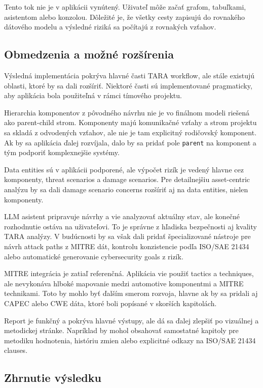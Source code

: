 \documentclass[11pt]{article}
\begin{document}
Tento tok nie je v aplikácii vynútený. Uživateľ môže začať grafom, tabuľkami, asistentom alebo konzolou. Dôležité je, že všetky cesty zapisujú do rovnakého dátového modelu a výsledné riziká sa počítajú z rovnakých vzťahov.

\subsection{Obmedzenia a možné rozšírenia}

Výsledná implementácia pokrýva hlavné časti TARA workflow, ale stále existujú oblasti, ktoré by sa dali rozšíriť. Niektoré časti sú implementované pragmaticky, aby aplikácia bola použiteľná v rámci tímového projektu.

Hierarchia komponentov z pôvodného návrhu nie je vo finálnom modeli riešená ako parent-child strom. Komponenty majú komunikačné vzťahy a strom projektu sa skladá z odvodených vzťahov, ale nie je tam explicitný rodičovský komponent. Ak by sa aplikácia ďalej rozvíjala, dalo by sa pridať pole \texttt{parent} na komponent a tým podporiť komplexnejšie systémy.

Data entities sú v aplikácii podporené, ale výpočet rizík je vedený hlavne cez komponenty, threat scenarios a damage scenarios. Pre detailnejšiu asset-centric analýzu by sa dali damage scenario concerns rozšíriť aj na data entities, nielen komponenty.

LLM asistent pripravuje návrhy a vie analyzovať aktuálny stav, ale konečné rozhodnutie ostáva na uživateľovi. To je správne z hľadiska bezpečnosti aj kvality TARA analýzy. V budúcnosti by sa však dali pridať špecializované nástroje pre návrh attack paths z MITRE dát, kontrolu konzistencie podľa ISO/SAE 21434 alebo automatické generovanie cybersecurity goals z rizík.

MITRE integrácia je zatiaľ referenčná. Aplikácia vie použiť tactics a techniques, ale nevykonáva hlboké mapovanie medzi automotive komponentmi a MITRE technikami. Toto by mohlo byť ďalším smerom rozvoja, hlavne ak by sa pridali aj CAPEC alebo CWE dáta, ktoré boli popísané v skorších kapitolách.

Report je funkčný a pokrýva hlavné výstupy, ale dá sa ďalej zlepšiť po vizuálnej a metodickej stránke. Napríklad by mohol obsahovať samostatné kapitoly pre metodiku hodnotenia, históriu zmien alebo explicitné odkazy na ISO/SAE 21434 clauses.

\subsection{Zhrnutie výsledku}
\end{document}
